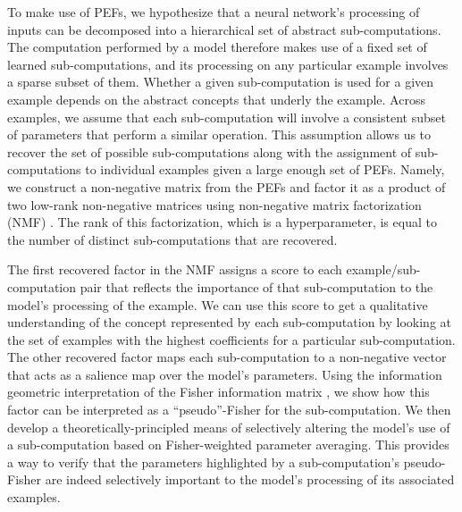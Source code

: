 \documentclass[dvipsnames]{article}
\begin{document}


To make use of PEFs, we hypothesize that a neural network's processing of inputs can be decomposed into a hierarchical set of abstract sub-computations.
The computation performed by a model therefore makes use of a fixed set of learned sub-computations, and its processing on any particular example involves a sparse subset of them.
Whether a given sub-computation is used for a given example depends on the abstract concepts that underly the example.
Across examples, we assume that each sub-computation will involve a consistent subset of parameters that perform a similar operation.
This assumption allows us to recover the set of possible sub-computations along with the assignment of sub-computations to individual examples given a large enough set of PEFs.
Namely, we construct a non-negative matrix from the PEFs and factor it as a product of two low-rank non-negative matrices using non-negative matrix factorization (NMF) \citep{lee1999learning}.
The rank of this factorization, which is a hyperparameter, is equal to the number of distinct sub-computations that are recovered.

The first recovered factor in the NMF assigns a score to each example/sub-computation pair that reflects the importance of that sub-computation to the model's processing of the example.
We can use this score to get a qualitative understanding of the concept represented by each sub-computation by looking at the set of examples with the highest coefficients for a particular sub-computation.
The other recovered factor maps each sub-computation to a non-negative vector that acts as a salience map over the model's parameters.
Using the information geometric interpretation of the Fisher information matrix \citep{amari2016information}, we show how this factor can be interpreted as a ``pseudo''-Fisher for the sub-computation.
We then develop a theoretically-principled means of selectively altering the model's use of a sub-computation based on Fisher-weighted parameter averaging.
This provides a way to verify that the parameters highlighted by a sub-computation's pseudo-Fisher are indeed selectively important to the model's processing of its associated examples.
\end{document}
